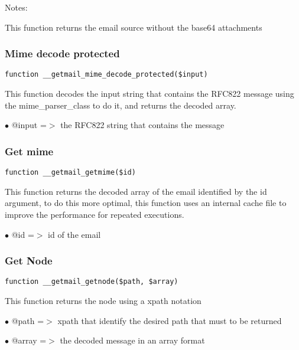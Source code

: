 \documentclass[a4paper]{article}
\begin{document}
Notes:

This function returns the email source without the base64 attachments

\hypertarget{toc92}{}
\subsubsection{Mime decode protected}

\begin{lstlisting}
function __getmail_mime_decode_protected($input)
\end{lstlisting}

This function decodes the input string that contains the RFC822 message
using the mime\_parser\_class to do it, and returns the decoded array.

\begin{compactitem}
\item[\color{myblue}$\bullet$] @input =$>$ the RFC822 string that contains the message
\end{compactitem}

\hypertarget{toc93}{}
\subsubsection{Get mime}

\begin{lstlisting}
function __getmail_getmime($id)
\end{lstlisting}

This function returns the decoded array of the email identified by the id
argument, to do this more optimal, this function uses an internal cache
file to improve the performance for repeated executions.

\begin{compactitem}
\item[\color{myblue}$\bullet$] @id =$>$ id of the email
\end{compactitem}

\hypertarget{toc94}{}
\subsubsection{Get Node}

\begin{lstlisting}
function __getmail_getnode($path, $array)
\end{lstlisting}

This function returns the node using a xpath notation

\begin{compactitem}
\item[\color{myblue}$\bullet$] @path  =$>$ xpath that identify the desired path that must to be returned
\item[\color{myblue}$\bullet$] @array =$>$ the decoded message in an array format
\end{compactitem}
\end{document}
